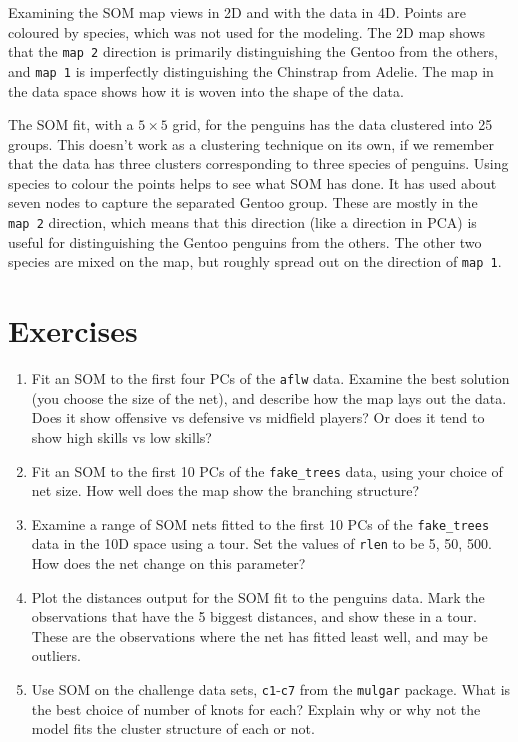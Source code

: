 \documentclass[
  letterpaper,
]{krantz}
\providecommand{\tightlist}{%
  \setlength{\itemsep}{0pt}\setlength{\parskip}{0pt}}\usepackage{longtable,booktabs,array}
\begin{document}
Examining the SOM map views in 2D and with the data in 4D. Points are
coloured by species, which was not used for the modeling. The 2D map
shows that the \texttt{map\ 2} direction is primarily distinguishing the
Gentoo from the others, and \texttt{map\ 1} is imperfectly
distinguishing the Chinstrap from Adelie. The map in the data space
shows how it is woven into the shape of the data.

The SOM fit, with a \(5\times 5\) grid, for the penguins has the data
clustered into 25 groups. This doesn't work as a clustering technique on
its own, if we remember that the data has three clusters corresponding
to three species of penguins. Using species to colour the points helps
to see what SOM has done. It has used about seven nodes to capture the
separated Gentoo group. These are mostly in the \texttt{map\ 2}
direction, which means that this direction (like a direction in PCA) is
useful for distinguishing the Gentoo penguins from the others. The other
two species are mixed on the map, but roughly spread out on the
direction of \texttt{map\ 1}.

\section*{Exercises}\label{exercises-10}


\begin{enumerate}
\def\labelenumi{\arabic{enumi}.}
\tightlist
\item
  Fit an SOM to the first four PCs of the \texttt{aflw} data. Examine
  the best solution (you choose the size of the net), and describe how
  the map lays out the data. Does it show offensive vs defensive vs
  midfield players? Or does it tend to show high skills vs low skills?
\item
  Fit an SOM to the first 10 PCs of the \texttt{fake\_trees} data, using
  your choice of net size. How well does the map show the branching
  structure?
\item
  Examine a range of SOM nets fitted to the first 10 PCs of the
  \texttt{fake\_trees} data in the 10D space using a tour. Set the
  values of \texttt{rlen} to be 5, 50, 500. How does the net change on
  this parameter?
\item
  Plot the distances output for the SOM fit to the penguins data. Mark
  the observations that have the 5 biggest distances, and show these in
  a tour. These are the observations where the net has fitted least
  well, and may be outliers.
\item
  Use SOM on the challenge data sets, \texttt{c1}-\texttt{c7} from the
  \texttt{mulgar} package. What is the best choice of number of knots
  for each? Explain why or why not the model fits the cluster structure
  of each or not.
\end{enumerate}
\end{document}
